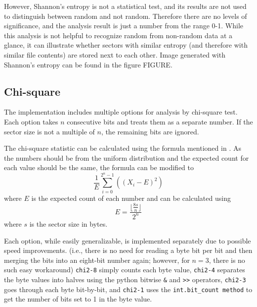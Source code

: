 \documentclass[
  digital, %
  oneside, %
  lof,     %
  lot,     %
]{fithesis4}
\begin{document}
However, Shannon's entropy is not a statistical test, and its results are not used to distinguish between random and not random.
Therefore there are no levels of significance, and the analysis result is just a number from the range 0-1.
While this analysis is not helpful to recognize random from non-random data at a glance, it can illustrate whether sectors with similar entropy (and therefore with similar file contents) are stored next to each other.
Image generated with Shannon's entropy can be found in the figure FIGURE.   %

\subsection{Chi-square}

The implementation includes multiple options for analysis by chi-square test.
Each option takes $n$ consecutive bits and treats them as a separate number.
If the sector size is not a multiple of $n$, the remaining bits are ignored.

The chi-square statistic can be calculated using the formula mentioned in \textbf{}.
As the numbers should be from the uniform distribution and the expected count for each value should be the same, the formula can be modified to
$$\frac{1}{E}\sum_{i = 0}^{2^n - 1}((X_i - E)^2)$$
where $E$ is the expected count of each number and can be calculated using 
$$E = \frac{\lfloor\frac{8s}{n}\rfloor}{2^n}$$
where $s$ is the sector size in bytes.

Each option, while easily generalizable, is implemented separately due to possible speed improvements. 
(i.e., there is no need for reading a byte bit per bit and then merging the bits into an eight-bit number again; however, for $n = 3$, there is no such easy workaround)
\texttt{chi2-8} simply counts each byte value, \texttt{chi2-4} separates the byte values into halves using the python bitwise \texttt{\&} and \texttt{>{>}} operators, \texttt{chi2-3} goes through each byte bit-by-bit, and \texttt{chi2-1} uses the \texttt{int.bit\_count method} to get the number of bits set to 1 in the byte value.
\end{document}
